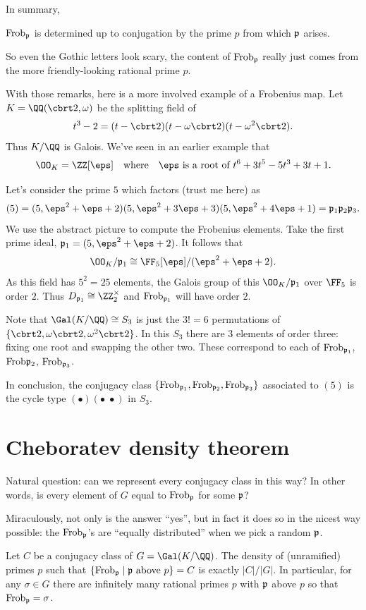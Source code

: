 In summary,
\begin{moral}
	$\mathrm{Frob}_{\mathfrak p}$ is determined up to conjugation by the prime $p$
	from which $\mathfrak p$ arises.
\end{moral}
So even the Gothic letters look scary, the content of $\mathrm{Frob}_{\mathfrak p}$
really just comes from the more friendly-looking rational prime $p$.


\begin{example}
	With those remarks, here is a more involved example of a Frobenius map.
	Let $K = \QQ(\cbrt2, \omega)$ be the splitting field of 
	\[ t^3-2 = (t-\cbrt2)(t-\omega\cbrt2)(t-\omega^2\cbrt2). \]
	Thus $K/\QQ$ is Galois.
	We've seen in an earlier example that
	\[ \OO_K = \ZZ[\eps] \quad\text{where}\quad \eps \text { is a root of } t^6+3t^5-5t^3+3t+1. \]

	Let's consider the prime $5$ which factors (trust me here) as
	\[ (5) = (5, \eps^2+\eps+2)(5, \eps^2+3\eps+3)(5, \eps^2+4\eps+1)
		= \pp_1 \pp_2 \pp_3. \]
	We use the abstract picture to compute the Frobenius elements.
	Take the first prime ideal, $\pp_1 = (5, \eps^2+\eps+2)$.
	It follows that \[ \OO_K / \pp_1 \cong \FF_5[\eps] / (\eps^2+\eps+2). \]
	As this field has $5^2=25$ elements,
	the Galois group of this $\OO_K/\pp_1$ over $\FF_5$ is order $2$.
	Thus $D_{\pp_1} \cong \Zm 2$ and $\mathrm{Frob}_{\mathfrak p_1}$ will have order $2$.

	Note that $\Gal(K/\QQ) \cong S_3$ is just the $3!=6$
	permutations of $\{\cbrt2,\omega\cbrt2,\omega^2\cbrt2\}$.
	In this $S_3$ there are $3$ elements of order three:
	fixing one root and swapping the other two.
	These correspond to each of $\mathrm{Frob}_{\mathfrak p_1}$, $\mathrm{Frob}{\mathfrak p_2}$, $\mathrm{Frob}_{\mathfrak p_3}$.

	In conclusion, the conjugacy class
	$\left\{ \mathrm{Frob}_{\mathfrak p_1}, \mathrm{Frob}_{\mathfrak p_2}, \mathrm{Frob}_{\mathfrak p_3} \right\}$
	associated to $(5)$ is the
	cycle type $(\bullet)(\bullet \; \bullet)$ in $S_3$.
\end{example}


\section{Cheboratev density theorem}
Natural question: can we represent every conjugacy class in this way?
In other words, is every element of $G$ equal to $\mathrm{Frob}_\mathfrak p$ for some $\mathfrak p$?

Miraculously, not only is the answer ``yes'', but in fact it does so in the nicest way possible:
the $\mathrm{Frob}_\mathfrak p$'s are ``equally distributed'' when we pick a random $\mathfrak p$.
\begin{theorem}
	Let $C$ be a conjugacy class of $G = \Gal(K/\QQ)$.
	The density of (unramified) primes $p$ such that $\{ \mathrm{Frob}_\mathfrak p \mid \mathfrak p \text{ above } p \} = C$
	is exactly $\left\lvert C \right\rvert / \left\lvert G \right\rvert$.
	In particular, for any $\sigma \in G$ there are infinitely many rational primes $p$
	with $\mathfrak p$ above $p$ so that $\mathrm{Frob}_{\mathfrak p} = \sigma$.
\end{theorem}

